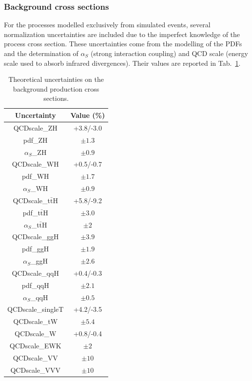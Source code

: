 \documentclass[../main.tex]{subfiles}
\begin{document}
\subsubsection*{Background cross sections}

For the processes modelled exclusively from simulated events, several normalization uncertainties are included due to the imperfect knowledge of the process cross section. These uncertainties come from the modelling of the PDFs and the determination of $\alpha_S$ (strong interaction coupling) and QCD scale (energy scale used to absorb infrared divergences). Their values are reported in Tab.~\ref{hh:tab:xs_unc}.

\begin{table}[h!]
\begin{center}
\begin{tabular}{c | c }
Uncertainty & Value (\%) \\\hline
QCDscale\_ZH & +3.8/-3.0 \\
pdf\_ZH & $\pm1.3$ \\
$\alpha_S$\_ZH & $\pm0.9$ \\
QCDscale\_WH & +0.5/-0.7 \\
pdf\_WH & $\pm1.7$ \\
$\alpha_S$\_WH & $\pm0.9$ \\
QCDscale\_t$\bar{\text{t}}$H & +5.8/-9.2 \\
pdf\_t$\bar{\text{t}}$H & $\pm3.0$ \\
$\alpha_S$\_t$\bar{\text{t}}$H & $\pm2$ \\
QCDscale\_ggH & $\pm3.9$ \\
pdf\_ggH & $\pm1.9$ \\
$\alpha_S$\_ggH & $\pm2.6$ \\
QCDscale\_qqH & +0.4/-0.3 \\
pdf\_qqH & $\pm2.1$ \\
$\alpha_S$\_qqH & $\pm0.5$ \\
QCDscale\_singleT & +4.2/-3.5 \\
QCDscale\_tW & $\pm5.4$ \\
QCDscale\_W & +0.8/-0.4 \\
QCDscale\_EWK & $\pm2$ \\
QCDscale\_VV & $\pm10$ \\
QCDscale\_VVV & $\pm10$ \\
\end{tabular}
\end{center}
\caption{Theoretical uncertainties on the background production cross sections.}
\label{hh:tab:xs_unc}
\end{table}
\end{document}
